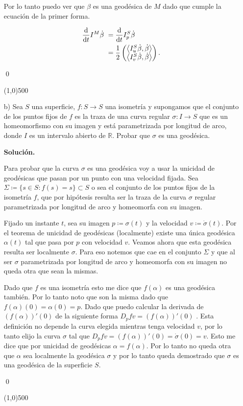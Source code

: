 \documentclass{article}
\newcommand{\R}{\mathbb R}
\begin{document}
\begin{itemize}
		Por lo tanto puedo ver que $\beta$ es una geodésica de $M$ dado que cumple la ecuación de la primer forma.
		
		\begin{align*}
		\dv{}{t}I^{M}\dot \beta \ &= \dv{}{t}I^{S}_{p}\dot \beta \\
		&= \frac{1}{2}  \begin{pmatrix}
		\left\langle I^{S}_{u}\dot\beta, \dot\beta \right\rangle \\
		\left\langle I^{S}_{v}\dot\beta, \dot\beta \right\rangle \\
		\end{pmatrix}.
		\end{align*} 
		
		\qed
		
		\line(1,0){500}
		
		\bigskip
		
		\item[b)] Sea $S$ una superficie, $f : S \to S$ una isometr\'ia y supongamos que el conjunto de los puntos fijos de $f$ es la traza de una curva regular $\sigma : I \to S$ que es un homeomorfismo con su imagen y est\'a parametrizada por longitud de arco, donde $I$ es un intervalo abierto de $\R$. Probar que $\sigma$ es una geod\'esica.
		
		\textbf{Solución.}
		
		Para probar que la curva $\sigma$ es una geodésica voy a usar la unicidad de geodésicas que pasan por un punto con una velocidad fijada. Sea $\Sigma \coloneqq \{s \in S: f(s)=s \} \subset S$ o sea el conjunto de los puntos fijos de la isometría $f$, que por hipótesis resulta ser la traza de la curva $\sigma$ regular parametrizada por longitud de arco y homeomorfa con su imagen.
		
		Fijado un instante $t$, sea su imagen $p \coloneqq \sigma(t)$ y la velocidad $v \coloneqq \dot\sigma(t)$. Por el teorema de unicidad de geodésicas (localmente) existe una única geodésica $\alpha(t)$ tal que pasa por $p$ con velocidad $v$. Veamos ahora que esta geodésica resulta ser localmente $\sigma$. Para eso notemos que cae en el conjunto $\Sigma$ y que al ser $\sigma$ parametrizada por longitud de arco y homeomorfa con su imagen no queda otra que sean la mismas.

		Dado que $f$ es una isometría esto me dice que $f(\alpha)$ es una geodésica también. Por lo tanto noto que son la misma dado que $f(\alpha)(0)=\alpha(0)=p$. Dado que puedo calcular la derivada de $(f(\alpha))'(0)$ de la siguiente forma $D_pf v = (f(\alpha))'(0)$ . Esta definición no depende la curva elegida mientras tenga velocidad $v$, por lo tanto elijo la curva $\sigma$ tal que $D_pf v = (f(\alpha))'(0) = \dot\sigma(0) = v$. Esto me dice que por unicidad de geodésicas $\alpha = f(\alpha)$. Por lo tanto no queda otra que $\alpha$ sea localmente la geodésica $\sigma$ y por lo tanto queda demostrado que $\sigma$ es una geodésica de la superficie $S$.
		
		\qed
		
		
		
		
		\line(1,0){500}
		
	\end{itemize}
\end{document}
